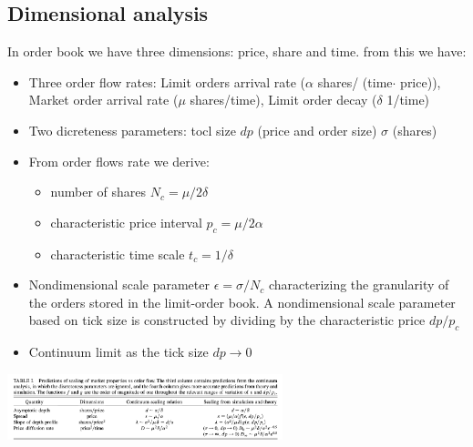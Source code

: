 \subsection{Dimensional analysis}
In order book we have three dimensions: price, share and time. from this we have:
\begin{itemize}
	\item Three order flow rates: Limit orders arrival rate ($\alpha$ shares/ (time$\cdot$ price)), Market order arrival rate ($\mu$ shares/time), Limit order decay ($\delta$ 1/time)
	\item Two dicreteness parameters: tocl size $dp$ (price and order size) $\sigma$ (shares)
	\item From order flows rate we derive:
	\begin{itemize}
		\item number of shares $N_c = \mu/2\delta$ 
		\item characteristic price interval $p_c = \mu / 2 \alpha$
		\item characteristic time scale $t_c = 1/ \delta$
	\end{itemize}
		\item Nondimensional scale parameter $\epsilon = \sigma/N_c$ characterizing the granularity of the orders stored in the limit-order book. A nondimensional scale parameter based on tick size is constructed by dividing by the characteristic price $dp/p_c$
		\item Continuum limit as the tick size $dp \to 0$
\end{itemize}
\begin{center}
	\includegraphics[width=0.6\textwidth]{picture/(24)table_dimensional_order_book.png}
\end{center}
